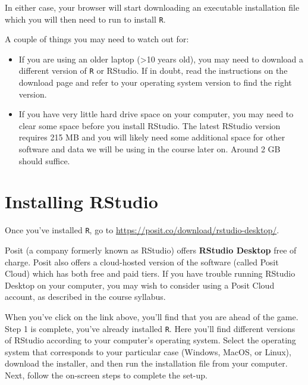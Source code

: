\documentclass[
  letterpaper,
]{book}
\begin{document}
In either case, your browser will start downloading an executable
installation file which you will then need to run to install \texttt{R}.

\begin{tcolorbox}[enhanced jigsaw, colframe=quarto-callout-caution-color-frame, colback=white, title=\textcolor{quarto-callout-caution-color}{\faFire}\hspace{0.5em}{Caution}, opacitybacktitle=0.6, coltitle=black, colbacktitle=quarto-callout-caution-color!10!white, arc=.35mm, leftrule=.75mm, bottomtitle=1mm, bottomrule=.15mm, breakable, opacityback=0, titlerule=0mm, rightrule=.15mm, left=2mm, toptitle=1mm, toprule=.15mm]

A couple of things you may need to watch out for:

\begin{itemize}
\item
  If you are using an older laptop (\textgreater10 years old), you may
  need to download a different version of \texttt{R} or RStudio. If in
  doubt, read the instructions on the download page and refer to your
  operating system version to find the right version.
\item
  If you have very little hard drive space on your computer, you may
  need to clear some space before you install RStudio. The latest
  RStudio version requires 215 MB and you will likely need some
  additional space for other software and data we will be using in the
  course later on. Around 2 GB should suffice.
\end{itemize}

\end{tcolorbox}

\hypertarget{installing-rstudio}{%
\section{Installing RStudio}\label{installing-rstudio}}

Once you've installed \texttt{R}, go to
\url{https://posit.co/download/rstudio-desktop/}.

Posit (a company formerly known as RStudio) offers \textbf{RStudio
Desktop} free of charge. Posit also offers a cloud-hosted version of the
software (called Posit Cloud) which has both free and paid tiers. If you
have trouble running RStudio Desktop on your computer, you may wish to
consider using a Posit Cloud account, as described in the course
syllabus.

When you've click on the link above, you'll find that you are ahead of
the game. Step 1 is complete, you've already installed \texttt{R}. Here
you'll find different versions of RStudio according to your computer's
operating system. Select the operating system that corresponds to your
particular case (Windows, MacOS, or Linux), download the installer, and
then run the installation file from your computer. Next, follow the
on-screen steps to complete the set-up.
\end{document}
